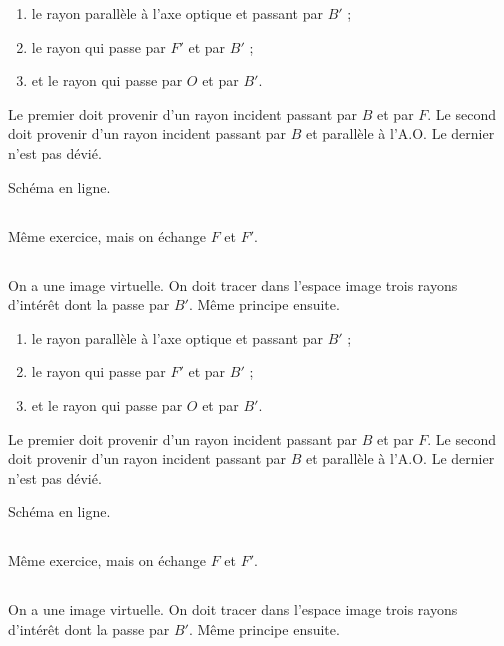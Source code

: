 \documentclass[10pt,a5paper,notitlepage]{book}
\begin{document}
\begin{enumerate}
    \item le rayon parallèle à l'axe optique et passant par $B'$ ;
    \item le rayon qui passe par $F'$ et par $B'$ ;
    \item et le rayon qui passe par $O$ et par $B'$.
\end{enumerate}

Le premier doit provenir d'un rayon incident passant par $B$ et par $F$. Le
second doit provenir d'un rayon incident passant par $B$ et parallèle à l'A.O.
Le dernier n'est pas dévié. \bigbreak

Schéma en ligne.

\subsection{}
Même exercice, mais on échange $F$ et $F'$.

\subsection{}
On a une image virtuelle. On doit tracer dans l'espace image trois rayons
d'intérêt dont la  passe par $B'$. Même principe ensuite.

\begin{enumerate}
    \item le rayon parallèle à l'axe optique et passant par $B'$ ;
    \item le rayon qui passe par $F'$ et par $B'$ ;
    \item et le rayon qui passe par $O$ et par $B'$.
\end{enumerate} \bigbreak

Le premier doit provenir d'un rayon incident passant par $B$ et par $F$. Le
second doit provenir d'un rayon incident passant par $B$ et parallèle à l'A.O.
Le dernier n'est pas dévié. \bigbreak

Schéma en ligne.

\subsection{}
Même exercice, mais on échange $F$ et $F'$.

\subsection{}
On a une image virtuelle. On doit tracer dans l'espace image trois rayons
d'intérêt dont la  passe par $B'$. Même principe ensuite.
\end{document}
